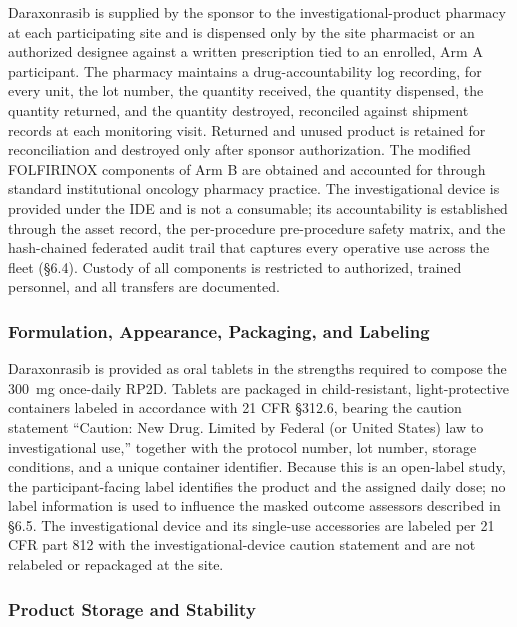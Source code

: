 Daraxonrasib is supplied by the sponsor to the investigational-product pharmacy at
each participating site and is dispensed only by the site pharmacist or an
authorized designee against a written prescription tied to an enrolled,
Arm A participant. The pharmacy maintains a drug-accountability log recording, for
every unit, the lot number, the quantity received, the quantity dispensed, the
quantity returned, and the quantity destroyed, reconciled against shipment records
at each monitoring visit. Returned and unused product is retained for reconciliation
and destroyed only after sponsor authorization. The modified FOLFIRINOX components
of Arm B are obtained and accounted for through standard institutional oncology
pharmacy practice. The investigational device is provided under the IDE and is not a
consumable; its accountability is established through the asset record, the
per-procedure pre-procedure safety matrix, and the hash-chained federated audit
trail that captures every operative use across the fleet (\S6.4). Custody of all
components is restricted to authorized, trained personnel, and all transfers are
documented.

\subsubsection{Formulation, Appearance, Packaging, and Labeling}

Daraxonrasib is provided as oral tablets in the strengths required to compose the
300~mg once-daily RP2D. Tablets are packaged in child-resistant, light-protective
containers labeled in accordance with 21 CFR \S312.6, bearing the caution statement
``Caution: New Drug. Limited by Federal (or United States) law to investigational
use,'' together with the protocol number, lot number, storage conditions, and a
unique container identifier. Because this is an open-label study, the
participant-facing label identifies the product and the assigned daily dose; no
label information is used to influence the masked outcome assessors described in
\S6.5. The investigational device and its single-use accessories are labeled per
21 CFR part 812 with the investigational-device caution statement and are not
relabeled or repackaged at the site.

\subsubsection{Product Storage and Stability}

